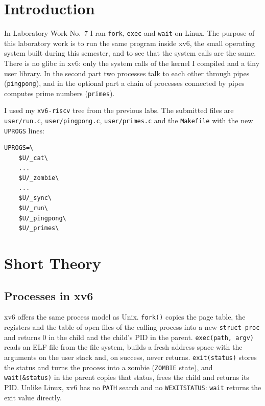 \documentclass[12pt,a4paper]{article}
\begin{document}
\setcounter{page}{2}
\tableofcontents
\newpage

\section*{Introduction}

In Laboratory Work No.~7 I ran \texttt{fork}, \texttt{exec} and \texttt{wait} on Linux. The purpose of this laboratory work is to run the same program inside xv6, the small operating system built during this semester, and to see that the system calls are the same. There is no glibc in xv6: only the system calls of the kernel I compiled and a tiny user library. In the second part two processes talk to each other through pipes (\texttt{pingpong}), and in the optional part a chain of processes connected by pipes computes prime numbers (\texttt{primes}).

I used my \texttt{xv6-riscv} tree from the previous labs. The submitted files are \texttt{user/run.c}, \texttt{user/pingpong.c}, \texttt{user/primes.c} and the \texttt{Makefile} with the new \texttt{UPROGS} lines:

\begin{lstlisting}[style=terminal,caption={The new lines in UPROGS (each starts with a TAB, nothing after the backslash)}]
UPROGS=\
	$U/_cat\
	...
	$U/_zombie\
	...
	$U/_sync\
	$U/_run\
	$U/_pingpong\
	$U/_primes\
\end{lstlisting}

\newpage
\section{Short Theory}

\subsection{Processes in xv6}

xv6 offers the same process model as Unix. \texttt{fork()} copies the page table, the registers and the table of open files of the calling process into a new \texttt{struct proc} and returns 0 in the child and the child's PID in the parent. \texttt{exec(path, argv)} reads an ELF file from the file system, builds a fresh address space with the arguments on the user stack and, on success, never returns. \texttt{exit(status)} stores the status and turns the process into a zombie (\texttt{ZOMBIE} state), and \texttt{wait(\&status)} in the parent copies that status, frees the child and returns its PID. Unlike Linux, xv6 has no \texttt{PATH} search and no \texttt{WEXITSTATUS}: \texttt{wait} returns the exit value directly.
\end{document}
